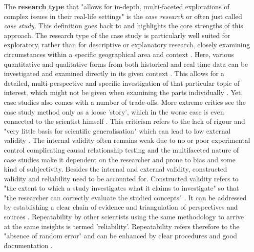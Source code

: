 
The \textbf{research type} that "allows for in-depth, multi-faceted explorations of complex issues in their real-life settings" \autocite{croweCaseStudyApproach2011} is the \textit{case research} or often just called \textit{case study}. This definition goes back to \autocite{yinCaseStudyResearch1984} and highlights the core strengths of this approach. The research type of the case study is particularly well suited for exploratory, rather than for descriptive or explanatory research, closely examining circumstances within a specific geographical area and context \autocite{zainalCaseStudyResearch2007}. Here, various quantitative and qualitative forms from both historical and real time data can be investigated and examined directly in its given context \autocite{fitzgeraldCaseStudiesResearch1999}. This allows for a detailed, multi-perspective and specific investigation of that particular topic of interest, which might not be given when examining the parts individually \autocite{pelzResearchMethodsSocial, zainalCaseStudyResearch2007}. Yet, case studies also comes with a number of trade-offs.\newline
More extreme critics see the case study method only as a loose 'story', which in the worse case is even connected to the scientist himself \autocite{fitzgeraldCaseStudiesResearch1999}. This criticism refers to the lack of rigour and "very little basis for scientific generalisation" which can lead to low external validity \autocites{yinCaseStudyResearch1984}[5]{zainalCaseStudyResearch2007}. The internal validity often remains weak due to no or poor experimental control complicating causal relationship testing and the multifaceted nature of case studies make it dependent on the researcher and prone to bias and some kind of subjectivity. Besides the internal and external validity, constructed validity and reliability need to be accounted for. Constructed validity refers to "the extent to which a study investigates what it claims to investigate" \autocite[3]{gibbertWhatPassesRigorous2008} so that "the researcher can correctly evaluate the studied concepts" \autocite[277]{ferreiraHowImproveValidity2020}. It can be addressed by establishing a clear chain of evidence and triangulation of perspectives and sources \autocite{gibbertWhatPassesRigorous2008}. Repeatability by other scientists using the same methodology to arrive at the same insights is termed 'reliability'. Repeatability refers therefore to the "absence of random error" and can be enhanced by clear procedures and good documentation \autocite[5]{gibbertWhatPassesRigorous2008}.\newline 
